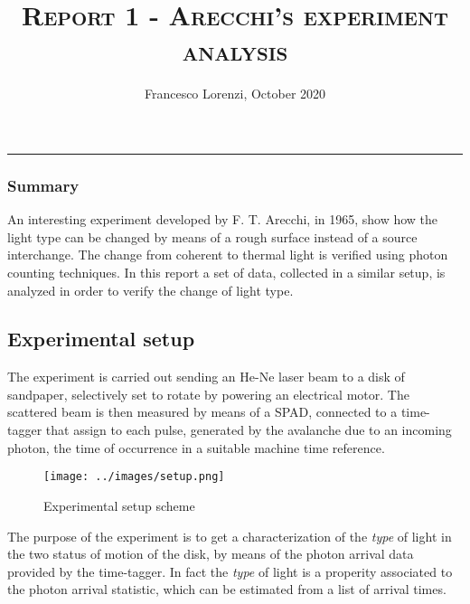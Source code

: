 \documentclass[10pt, a4paper, final]{article}
\title{\textsc{Report 1 - Arecchi's experiment analysis}}
\author{Francesco Lorenzi,      October 2020}
\date{}
\begin{document}
\maketitle
\vspace{-25pt}

\begin{center}
	\rule[0pt]{400pt}{0.5pt}
\end{center}
\vspace{-15pt}

\begin{multicols}{2}
\subsubsection*{Summary}
An interesting experiment developed by F. T. Arecchi, in 1965, show how the light type can be changed by means of a rough surface instead of a source interchange. The change from coherent to thermal light is verified using photon counting techniques. In this report a set of data, collected in a similar setup, is analyzed in order to verify the change of light type.

\subsection*{Experimental setup}
The experiment is carried out sending an He-Ne laser beam to a disk of sandpaper, selectively set to rotate by powering an electrical motor. The scattered beam is then measured by means of a SPAD, connected to a time-tagger that assign to each pulse, generated by the avalanche due to an incoming photon, the time of occurrence in a suitable machine time reference. 
\begin{mdframed}
    \begin{figure}[H]
    \centering
    \texttt{[image: ../images/setup.png]}
    \caption{Experimental setup scheme}
  \end{figure}
\end{mdframed}
 


The purpose of the experiment is to get a characterization of the \emph{type} of light in the two status of motion of the disk, by means of the photon arrival data provided by the time-tagger.
In fact the \emph{type} of light is a properity associated to the photon arrival statistic, which can be estimated from a list of arrival times.


\end{multicols}
\end{document}
